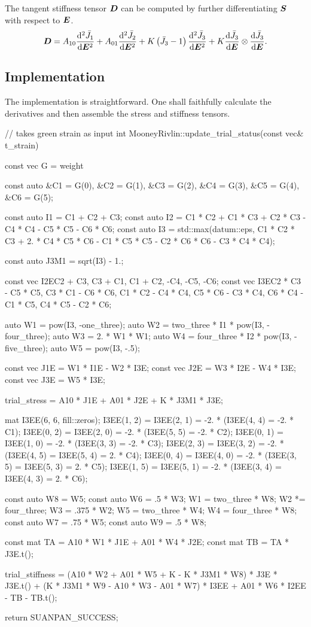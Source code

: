 The tangent stiffness tensor $\bm{D}$ can be computed by further differentiating $\bm{S}$ with respect to $\bm{E}$.
\begin{gather}
    \bm{D}=A_{10}\dfrac{\mathrm{d}^2\bar{J_1}}{\mathrm{d}\bm{E}^2}+A_{01}\dfrac{\mathrm{d}^2\bar{J_2}}{\mathrm{d}\bm{E}^2}+K\left(\bar{J_3}-1\right)\dfrac{\mathrm{d}^2\bar{J_3}}{\mathrm{d}\bm{E}^2}+K\dfrac{\mathrm{d}\bar{J_3}}{\mathrm{d}\bm{E}}\otimes\dfrac{\mathrm{d}\bar{J_3}}{\mathrm{d}\bm{E}}.
\end{gather}
\subsection{Implementation}
The implementation is straightforward.
One shall faithfully calculate the derivatives and then assemble the stress and stiffness tensors.
\begin{cppcode}
// takes green strain as input
int MooneyRivlin::update_trial_status(const vec& t_strain) {
    const vec G = weight %

    const auto &C1 = G(0), &C2 = G(1), &C3 = G(2), &C4 = G(3), &C5 = G(4), &C6 = G(5);

    const auto I1 = C1 + C2 + C3;
    const auto I2 = C1 * C2 + C1 * C3 + C2 * C3 - C4 * C4 - C5 * C5 - C6 * C6;
    const auto I3 = std::max(datum::eps, C1 * C2 * C3 + 2. * C4 * C5 * C6 - C1 * C5 * C5 - C2 * C6 * C6 - C3 * C4 * C4);

    const auto J3M1 = sqrt(I3) - 1.;

    const vec I2E{C2 + C3, C3 + C1, C1 + C2, -C4, -C5, -C6};
    const vec I3E{C2 * C3 - C5 * C5, C3 * C1 - C6 * C6, C1 * C2 - C4 * C4, C5 * C6 - C3 * C4, C6 * C4 - C1 * C5, C4 * C5 - C2 * C6};

    auto W1 = pow(I3, -one_three);
    auto W2 = two_three * I1 * pow(I3, -four_three);
    auto W3 = 2. * W1 * W1;
    auto W4 = four_three * I2 * pow(I3, -five_three);
    auto W5 = pow(I3, -.5);

    const vec J1E = W1 * I1E - W2 * I3E;
    const vec J2E = W3 * I2E - W4 * I3E;
    const vec J3E = W5 * I3E;

    trial_stress = A10 * J1E + A01 * J2E + K * J3M1 * J3E;

    mat I3EE(6, 6, fill::zeros);
    I3EE(1, 2) = I3EE(2, 1) = -2. * (I3EE(4, 4) = -2. * C1);
    I3EE(0, 2) = I3EE(2, 0) = -2. * (I3EE(5, 5) = -2. * C2);
    I3EE(0, 1) = I3EE(1, 0) = -2. * (I3EE(3, 3) = -2. * C3);
    I3EE(2, 3) = I3EE(3, 2) = -2. * (I3EE(4, 5) = I3EE(5, 4) = 2. * C4);
    I3EE(0, 4) = I3EE(4, 0) = -2. * (I3EE(3, 5) = I3EE(5, 3) = 2. * C5);
    I3EE(1, 5) = I3EE(5, 1) = -2. * (I3EE(3, 4) = I3EE(4, 3) = 2. * C6);

    const auto W8 = W5;
    const auto W6 = .5 * W3;
    W1 = two_three * W8;
    W2 *= four_three;
    W3 = .375 * W2;
    W5 = two_three * W4;
    W4 = four_three * W8;
    const auto W7 = .75 * W5;
    const auto W9 = .5 * W8;

    const mat TA = A10 * W1 * J1E + A01 * W4 * J2E;
    const mat TB = TA * J3E.t();

    trial_stiffness = (A10 * W2 + A01 * W5 + K - K * J3M1 * W8) * J3E * J3E.t() + (K * J3M1 * W9 - A10 * W3 - A01 * W7) * I3EE + A01 * W6 * I2EE - TB - TB.t();

    return SUANPAN_SUCCESS;
}
\end{cppcode}
